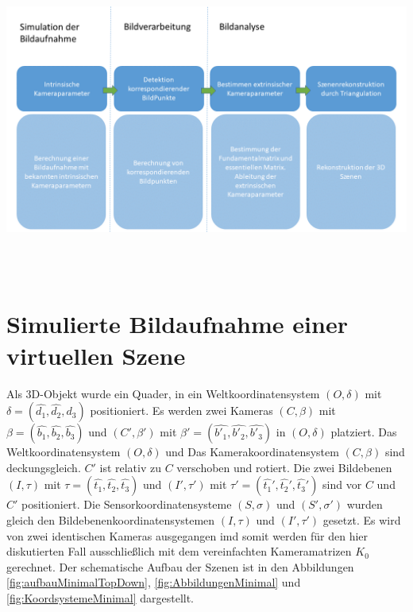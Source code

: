 \begin{minipage}{\linewidth}
	\centering
	\includegraphics[width=1.\linewidth]{images/NEU_Virtuel_Arbeitsprozess.png}
	\label{fig:ArbeitsProzessVirtuell}
\end{minipage}\\ \\

%



\section{Simulierte Bildaufnahme einer virtuellen Szene}

Als 3D-Objekt wurde ein Quader, in ein Weltkoordinatensystem $(O,\delta)$ mit $\delta = (\hat{d_1},\hat{d_2},\hat{d_3})$ positioniert. Es werden zwei Kameras $(C,\beta)$ mit $\beta = (\hat{b_1},\hat{b_2},\hat{b_3})$ und $(C',\beta')$ mit $\beta' = (\hat{b'_1},\hat{b'_2},\hat{b'_3})$ in $(O,\delta)$ platziert. Das Weltkoordinatensystem $(O,\delta)$ und Das Kamerakoordinatensystem $(C,\beta)$ sind deckungsgleich. $C'$ ist relativ zu $C$ verschoben und rotiert. Die zwei Bildebenen $(I,\tau)$ mit $\tau = (\hat{t_1},\hat{t_2},\hat{t_3})$ und $(I',\tau')$ mit $\tau' = (\hat{t_1}',\hat{t_2}',\hat{t_3}')$ sind vor $C$ und $C'$ positioniert. Die Sensorkoordinatensysteme $(S,\sigma)$ und $(S',\sigma')$ wurden gleich den Bildebenenkoordinatensystemen $(I,\tau)$ und $(I',\tau')$ gesetzt. Es wird von zwei identischen Kameras ausgegangen imd somit werden  für den hier diskutierten Fall ausschließlich mit dem vereinfachten Kameramatrizen $K_0$ gerechnet. Der schematische Aufbau der Szenen ist in den Abbildungen \ref{fig:aufbauMinimalTopDown}, \ref{fig:AbbildungenMinimal} und \ref{fig:KoordsystemeMinimal} dargestellt.

